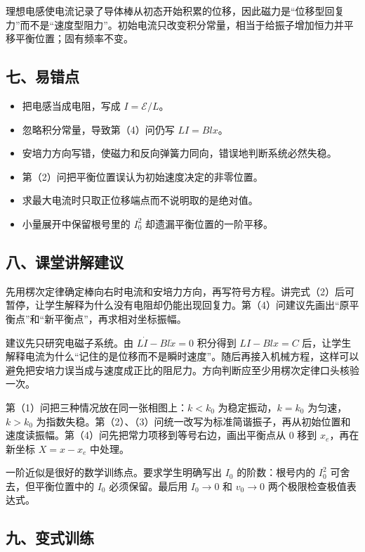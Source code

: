 \documentclass[12pt,a4paper,UTF8]{ctexart}
\newcommand{\tightlist}{\setlength{\itemsep}{0pt}\setlength{\parskip}{0pt}}
\begin{document}
理想电感使电流记录了导体棒从初态开始积累的位移，因此磁力是``位移型回复力''而不是``速度型阻力''。初始电流只改变积分常量，相当于给振子增加恒力并平移平衡位置；固有频率不变。

\subsection{七、易错点}\label{ux4e03ux6613ux9519ux70b9-4}

\begin{itemize}
\tightlist
\item
  把电感当成电阻，写成 \(I=\mathcal E/L\)。
\item
  忽略积分常量，导致第（4）问仍写 \(LI=Blx\)。
\item
  安培力方向写错，使磁力和反向弹簧力同向，错误地判断系统必然失稳。
\item
  第（2）问把平衡位置误认为初始速度决定的非零位置。
\item
  求最大电流时只取正位移端点而不说明取的是绝对值。
\item
  小量展开中保留根号里的 \(I_0^2\) 却遗漏平衡位置的一阶平移。
\end{itemize}

\subsection{八、课堂讲解建议}\label{ux516bux8bfeux5802ux8bb2ux89e3ux5efaux8bae-4}

先用楞次定律确定棒向右时电流和安培力方向，再写符号方程。讲完式（2）后可暂停，让学生解释为什么没有电阻却仍能出现回复力。第（4）问建议先画出``原平衡点''和``新平衡点''，再求相对坐标振幅。

建议先只研究电磁子系统。由 \(L\dot I-Bl\dot x=0\) 积分得到 \(LI-Blx=C\)
后，让学生解释电流为什么``记住的是位移而不是瞬时速度''。随后再接入机械方程，这样可以避免把安培力误当成与速度成正比的阻尼力。方向判断应至少用楞次定律口头核验一次。

第（1）问把三种情况放在同一张相图上：\(k<k_0\) 为稳定振动，\(k=k_0\)
为匀速，\(k>k_0\)
为指数失稳。第（2）、（3）问统一改写为标准简谐振子，再从初始位置和速度读振幅。第（4）问先把常力项移到等号右边，画出平衡点从
\(0\) 移到 \(x_e\)，再在新坐标 \(X=x-x_e\) 中处理。

一阶近似是很好的数学训练点。要求学生明确写出 \(I_0\) 的阶数：根号内的
\(I_0^2\) 可舍去，但平衡位置中的 \(I_0\) 必须保留。最后用 \(I_0\to0\) 和
\(v_0\to0\) 两个极限检查极值表达式。

\subsection{九、变式训练}\label{ux4e5dux53d8ux5f0fux8badux7ec3-4}
\end{document}
